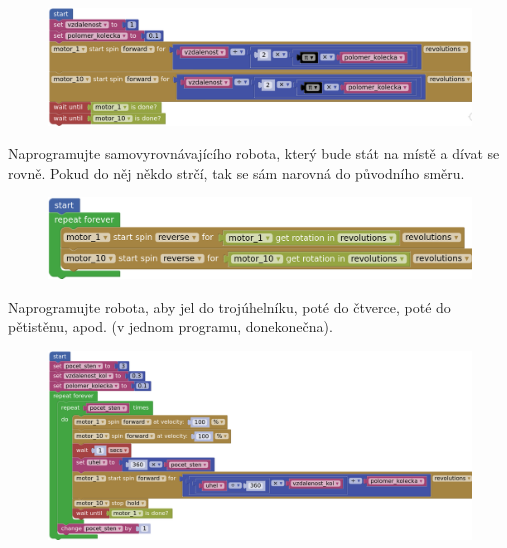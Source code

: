 \documentclass[../main.tex]{subfiles}
\begin{document}
	\begin{solution}
		\begin{figure}
			\centering
			\begin{minipage}{0.8\textwidth}
				\includegraphics[width=\linewidth]{Images/05/solv.png}
			\end{minipage}
		\end{figure}
	\end{solution}

	\begin{question*}
		Naprogramujte samovyrovnávajícího robota, který bude stát na místě a dívat se rovně. Pokud do něj někdo strčí, tak se sám narovná do původního směru.
	\end{question*}

	\begin{solution}
		\begin{figure}
			\centering
			\begin{minipage}{0.8\textwidth}
				\includegraphics[width=\linewidth]{Images/05/solstay.png}
			\end{minipage}
		\end{figure}
	\end{solution}

	\begin{question*}
		Naprogramujte robota, aby jel do trojúhelníku, poté do čtverce, poté do pětistěnu, apod. (v jednom programu, donekonečna).
	\end{question*}

	\begin{solution}
		\begin{figure}
			\centering
			\begin{minipage}{0.8\textwidth}
				\includegraphics[width=\linewidth]{Images/05/soltri.png}
			\end{minipage}
		\end{figure}
	\end{solution}
\end{document}
